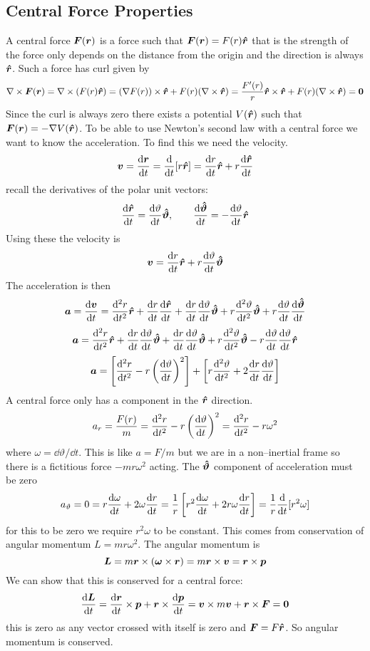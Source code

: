\documentclass{article}
\begin{document}
    \subsection{Central Force Properties}
    A central force \(\bm{F}(\bm{r})\) is a force such that \(\bm{F}(\bm{r}) = F(r)\bm{\hat{r}}\) that is the strength of the force only depends on the distance from the origin and the direction is always \(\bm{\hat{r}}\).
    Such a force has curl given by
    \[\nabla\times\bm{F}(\bm{r}) = \nabla\times(F(r)\bm{\hat{r}}) = (\nabla F(r))\times\bm{\hat{r}} + F(r)(\nabla\times\bm{\hat{r}}) = \frac{F'(r)}{r}\bm{\hat{r}}\times\bm{\hat{r}} + F(r)(\nabla\times\bm{\hat{r}}) = \bm{0}\]
    Since the curl is always zero there exists a potential \(V(\bm{\hat{r}})\) such that \(\bm{F}(\bm{r}) = -\nabla V(\bm{\hat{r}})\).
    To be able to use Newton's second law with a central force we want to know the acceleration.
    To find this we need the velocity.
    \[\bm{v} = \dv{\bm{r}}{t} = \dv{t}[r\bm{\hat{r}}] = \dv{r}{t}\bm{\hat{r}} + r\dv{\bm{\hat{r}}}{t}\]
    recall the derivatives of the polar unit vectors:
    \[\dv{\bm{\hat{r}}}{t} = \dv{\vartheta}{t}\bm{\hat{\vartheta}},\qquad \dv{\bm{\hat{\vartheta}}}{t} = -\dv{\vartheta}{t}\bm{\hat{r}}\]
    Using these the velocity is
    \[\bm{v} = \dv{r}{t}\bm{\hat{r}} + r\dv{\vartheta}{t}\bm{\hat{\vartheta}}\]
    The acceleration is then
    \[\bm{a} = \dv{\bm{v}}{t} = \dv[2]{r}{t}\bm{\hat{r}} + \dv{r}{t}\dv{\bm{\hat{r}}}{t} + \dv{r}{t}\dv{\vartheta}{t}\bm{\hat{\vartheta}} + r\dv[2]{\vartheta}{t}\bm{\hat{\vartheta}} + r\dv{\vartheta}{t}\dv{\bm{\hat{\vartheta}}}{t}\]
    \[\bm{a} = \dv[2]{r}{t}\bm{\hat{r}} + \dv{r}{t}\dv{\vartheta}{t}\bm{\hat{\vartheta}} + \dv{r}{t}\dv{\vartheta}{t}\bm{\hat{\vartheta}} + r\dv[2]{\vartheta}{t}\bm{\hat{\vartheta}} - r\dv{\vartheta}{t}\dv{\vartheta}{t}\bm{\hat{r}}\]
    \[\bm{a} = \left[\dv[2]{r}{t} - r\left(\dv{\vartheta}{t}\right)^2\right] + \left[r\dv[2]{\vartheta}{t} + 2\dv{r}{t}\dv{\vartheta}{t}\right]\]
    A central force only has a component in the \(\bm{\hat{r}}\) direction.
    \[a_r = \frac{F(r)}{m} = \dv[2]{r}{t} - r\left(\dv{\vartheta}{t}\right)^2 = \dv[2]{r}{t} - r\omega^2\]
    where \(\omega = \dd\vartheta/\dd t\).
    This is like \(a = F/m\) but we are in a non--inertial frame so there is a fictitious force \(-mr\omega^2\) acting.
    The \(\bm{\hat{\vartheta}}\) component of acceleration must be zero
    \[a_\vartheta = 0 = r\dv{\omega}{t} + 2\omega\dv{r}{t} = \frac{1}{r}\left[r^2\dv{\omega}{t} + 2r\omega\dv{r}{t}\right] = \frac{1}{r}\dv{t}[r^2\omega]\]
    for this to be zero we require \(r^2\omega\) to be constant.
    This comes from conservation of angular momentum \(L = mr\omega^2\).
    The angular momentum is
    \[\bm{L} = m\bm{r}\times(\bm{\omega}\times\bm{r}) = m\bm{r}\times\bm{v} = \bm{r}\times\bm{p}\]
    We can show that this is conserved for a central force:
    \[\dv{\bm{L}}{t} = \dv{\bm{r}}{t}\times\bm{p} + \bm{r}\times\dv{\bm{p}}{t} = \bm{v}\times m\bm{v} + \bm{r}\times\bm{F} = \bm{0}\]
    this is zero as any vector crossed with itself is zero and \(\bm{F} = F\bm{\hat{r}}\).
    So angular momentum is conserved.
    
\end{document}
